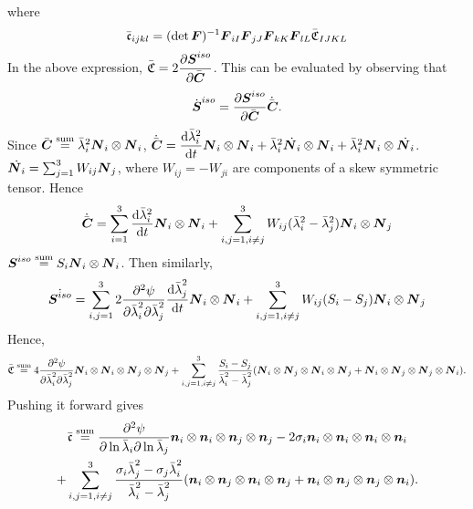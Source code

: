 \documentclass[11pt,twoside,TimesRoman]{article}
\newcommand{\parder}[2]{{\dfrac{\partial #1}{\partial #2}}}
\newcommand{\totder}[2]{{\dfrac{\mathrm{d} #1}{\mathrm{d}#2}}}
\begin{document}
where 
\begin{equation}
	\bar{\mathfrak{c}}_{ijkl} = (\det \mbox{\boldmath $F$})^{-1} \mbox{\boldmath $F$}_{iI} \mbox{\boldmath $F$}_{jJ} \mbox{\boldmath $F$}_{kK} \mbox{\boldmath $F$}_{lL} \bar{\mathfrak{C}}_{IJKL}
\end{equation}
In the above expression, $\bar{\mathfrak{C}} = 2\parder{\bfS^{iso}}{\bfCbar}$. This can be evaluated by observing that
\begin{equation}
	\dot{\bfS}^{iso} = \parder{\bfS^{iso}}{\bfCbar}  \dot{\bfCbar}.
\end{equation}
Since $\bar{\mbox{\boldmath $C$}} \stackrel{\text{sum}}{=}\bar{\lambda}_i^2 \mbox{\boldmath $N$}_i \otimes \mbox{\boldmath $N$}_i$, $\dot{\bfCbar} = \totder{{\bar{\lambda}_i^2}}{t}  \bfN_i \otimes \bfN_i + \bar{\lambda}_i^2 \dot{\bfN_i} \otimes \bfN_i + \bar{\lambda}_i^2 \bfN_i \otimes \dot{\bfN_i} $. $\dot{\mbox{\boldmath $N$}_i} = \sum_{j=1}^{3} W_{ij} \mbox{\boldmath $N$}_j$, where $W_{ij} = -W_{ji}$ are components of a skew symmetric tensor. Hence 
\begin{equation}
	\dot{\bfCbar} = \sum_{i=1}^{3}\totder{{\bar{\lambda}_i^2}}{t}  \bfN_i \otimes \bfN_i + \sum_{i,j=1, i\neq j}^{3}W_{ij}({\bar{\lambda}_i^2}-{\bar{\lambda}_j^2}) \bfN_i \otimes \bfN_j
\end{equation}
$\mbox{\boldmath $S$}^{iso} \stackrel{\text{sum}}{=} S_i \mbox{\boldmath $N$}_i \otimes \mbox{\boldmath $N$}_i $. Then similarly,
\begin{equation}
	\dot{\bfS^{iso}} = \sum_{i,j=1}^{3}2\parder{^2\psi}{\lambdabar_i^2 \partial \lambdabar_j^2} \totder{\lambdabar_j^2}{t} \bfN_i \otimes \bfN_i + \sum_{i,j=1, i\neq j}^{3}W_{ij}(S_i-S_j) \bfN_i \otimes \bfN_j
\end{equation}
Hence, 
\begin{equation}
	\bar{\mathfrak{C}} \stackrel{\text{sum}}{=} 4 \parder{^2\psi}{\lambdabar_i^2 \partial \lambdabar_j^2} \bfN_i \otimes \bfN_i \otimes \bfN_j \otimes \bfN_j + \sum_{i,j=1, i\neq j}^{3} \frac{S_i-S_j}{\lambdabar_i^2 - \lambdabar_j^2}(\bfN_i \otimes \bfN_j \otimes \bfN_i \otimes \bfN_j + \bfN_i \otimes \bfN_j \otimes \bfN_j \otimes \bfN_i).
\end{equation}
Pushing it forward gives
\begin{multline}
\bar{\mathfrak{c}} \stackrel{\text{sum}}{=} \parder{^2\psi}{\ln \lambdabar_i \partial \ln \lambdabar_j} \bfn_i \otimes \bfn_i \otimes \bfn_j \otimes \bfn_j - 2\sigma_i \bfn_i \otimes \bfn_i \otimes \bfn_i \otimes \bfn_i\\
+ \sum_{i,j=1, i\neq j}^{3} \frac{\sigma_i \lambdabar_j^2 -\sigma_j \lambdabar_i^2}{\lambdabar_i^2 - \lambdabar_j^2}(\bfn_i \otimes \bfn_j \otimes \bfn_i \otimes \bfn_j + \bfn_i \otimes \bfn_j \otimes \bfn_j \otimes \bfn_i).
\end{multline}
\end{document}
